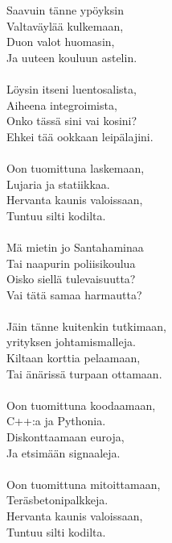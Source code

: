 
            Saavuin tänne ypöyksin \\
            Valtaväylää kulkemaan, \\
            Duon valot huomasin, \\
            Ja uuteen kouluun astelin. \\
\hspace{10mm} \\
            Löysin itseni luentosalista, \\
            Aiheena integroimista, \\
            Onko tässä sini vai kosini? \\
            Ehkei tää ookkaan leipälajini. \\
\hspace{10mm} \\
            Oon tuomittuna laskemaan, \\
            Lujaria ja statiikkaa. \\
            Hervanta kaunis valoissaan, \\
            Tuntuu silti kodilta. \\
\hspace{10mm} \\
            Mä mietin jo Santahaminaa \\
            Tai naapurin poliisikoulua \\
            Oisko siellä tulevaisuutta? \\
            Vai tätä samaa harmautta? \\
\hspace{10mm} \\
            Jäin tänne kuitenkin tutkimaan, \\
            yrityksen johtamismalleja. \\
            Kiltaan korttia pelaamaan, \\
            Tai änärissä turpaan ottamaan. \\
\hspace{10mm} \\
            Oon tuomittuna koodaamaan, \\
            C++:a ja Pythonia. \\
            Diskonttaamaan euroja, \\
            Ja etsimään signaaleja. \\
\hspace{10mm} \\
            Oon tuomittuna mitoittamaan, \\
            Teräsbetonipalkkeja. \\
            Hervanta kaunis valoissaan, \\
            Tuntuu silti kodilta. \\

